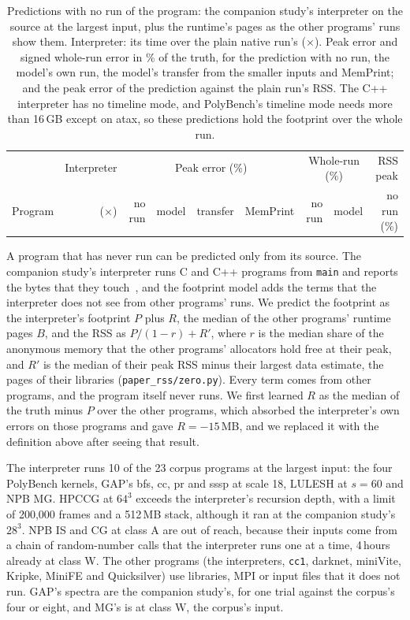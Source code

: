\documentclass[11pt]{article}
\newcommand{\memprint}{MemPrint}
\begin{document}
\begin{table}[!htbp]
\centering
\small
\caption{Predictions with no run of the program: the companion study's interpreter on the source at the largest
input, plus the runtime's pages as the other programs' runs show them. Interpreter: its time over the plain native
run's ($\times$). Peak error and signed whole-run error in \% of the truth, for the prediction with no run, the
model's own run, the model's transfer from the smaller inputs and \memprint{}; and the peak error of the prediction
against the plain run's RSS. The C++ interpreter has no timeline mode, and PolyBench's timeline mode needs more than
16\,GB except on atax, so these predictions hold the footprint over the whole run.}
\label{tab:zero}
\setlength{\tabcolsep}{3.5pt}
\begin{tabular}{lrrrrrrrr}
\toprule
 & Interpreter & \multicolumn{4}{c}{Peak error (\%)} & \multicolumn{2}{c}{Whole-run (\%)} & RSS peak \\
\cmidrule(lr){3-6}\cmidrule(lr){7-8}
Program & ($\times$) & no run & model & transfer & \memprint{} & no run & model & no run (\%) \\
\midrule

\bottomrule
\end{tabular}
\end{table}

A program that has never run can be predicted only from its source. The companion study's interpreter runs C and C++
programs from \texttt{main} and reports the bytes that they touch~\cite{memprintstatic}, and the footprint model adds
the terms that the interpreter does not see from other programs' runs. We predict the footprint as the interpreter's
footprint $P$ plus $R$, the median of the other programs' runtime pages $B$, and the RSS as $P / (1 - r) + R'$, where
$r$ is the median share of the anonymous memory that the other programs' allocators hold free at their peak, and $R'$
is the median of their peak RSS minus their largest data estimate, the pages of their libraries
(\texttt{paper\_rss/zero.py}). Every term comes from other programs, and the program itself never runs. We first
learned $R$ as the median of the truth minus $P$ over the other programs, which absorbed the interpreter's own errors
on those programs and gave $R = -15$\,MB, and we replaced it with the definition above after seeing that result.

The interpreter runs 10 of the 23 corpus programs at the largest input: the four PolyBench kernels, GAP's bfs, cc, pr
and sssp at scale 18, LULESH at $s = 60$ and NPB MG. HPCCG at $64^3$ exceeds the interpreter's recursion depth, with a
limit of 200{,}000 frames and a 512\,MB stack, although it ran at the companion study's $28^3$. NPB IS and CG at class
A are out of reach, because their inputs come
from a chain of random-number calls that the interpreter runs one at a time, 4\,hours already at class W. The other
programs (the interpreters, \texttt{cc1}, darknet, miniVite, Kripke, MiniFE and Quicksilver) use libraries, MPI or
input files that it does not run. GAP's spectra are the companion study's, for one trial against the corpus's four or
eight, and MG's is at class W, the corpus's input.
\end{document}
